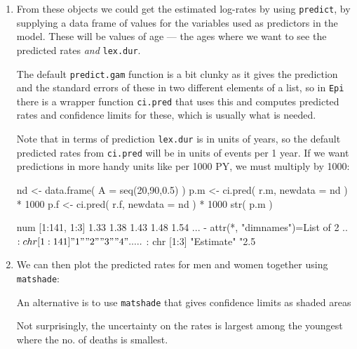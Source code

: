 \begin{enumerate}[resume]
\item From these objects we could get the estimated log-rates by using
  \texttt{predict}, by supplying a data frame of values for the
  variables used as predictors in the model. These will be values of
  age --- the ages where we want to see the predicted rates \emph{and}
  \texttt{lex.dur}.
  
  The default \texttt{predict.gam} function is a bit clunky as it
  gives the prediction and the standard errors of these in two different
  elements of a list, so in \texttt{Epi} there is a wrapper function
  \texttt{ci.pred} that uses this and computes predicted rates and
  confidence limits for these, which is usually what is needed. 
  
  Note that in terms of prediction \texttt{lex.dur} is in units of
  years, so the default predicted rates from \texttt{ci.pred} will be
  in units of events per 1 year. If we want predictions in more handy
  units like per 1000 PY, we must multiply by 1000:
\begin{Schunk}
\begin{Sinput}
 nd <-  data.frame( A = seq(20,90,0.5) )
 p.m <- ci.pred( r.m, newdata = nd ) * 1000
 p.f <- ci.pred( r.f, newdata = nd ) * 1000
 str( p.m )
\end{Sinput}
\begin{Soutput}
 num [1:141, 1:3] 1.33 1.38 1.43 1.48 1.54 ...
 - attr(*, "dimnames")=List of 2
  ..$ : chr [1:141] "1" "2" "3" "4" ...
  ..$ : chr [1:3] "Estimate" "2.5%" "97.5%"
\end{Soutput}
\end{Schunk}
  
  
\item We can then plot the predicted rates for men and women together
  using \texttt{matshade}:
\begin{Schunk}
\end{Schunk}
An alternative is to use \texttt{matshade} that gives confidence
limits as shaded areas

   Not surprisingly, the uncertainty on the rates is largest among the
   youngest where the no. of deaths is smallest. 

\end{enumerate}

